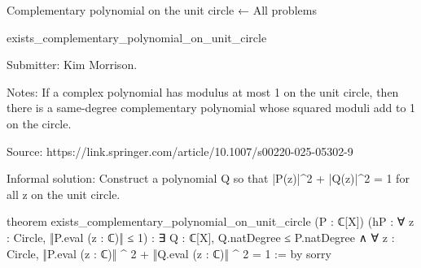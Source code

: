 Complementary polynomial on the unit circle
← All problems

exists_complementary_polynomial_on_unit_circle

Submitter: Kim Morrison.

Notes: If a complex polynomial has modulus at most 1 on the unit circle, then there is a same-degree complementary polynomial whose squared moduli add to 1 on the circle.

Source: https://link.springer.com/article/10.1007/s00220-025-05302-9

Informal solution: Construct a polynomial Q so that |P(z)|^2 + |Q(z)|^2 = 1 for all z on the unit circle.

theorem exists_complementary_polynomial_on_unit_circle (P : ℂ[X])
    (hP : ∀ z : Circle, ‖P.eval (z : ℂ)‖ ≤ 1) :
    ∃ Q : ℂ[X],
      Q.natDegree ≤ P.natDegree ∧
        ∀ z : Circle, ‖P.eval (z : ℂ)‖ ^ 2 + ‖Q.eval (z : ℂ)‖ ^ 2 = 1 := by
  sorry